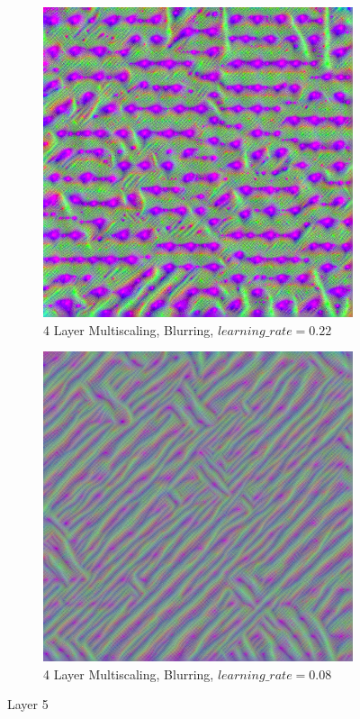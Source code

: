 \newpage
\begin{figure}
    \captionsetup{justification=centering}

    \begin{subfigure}[t]{0.48\textwidth}
        \captionsetup{justification=centering}
        \centering
        \includegraphics[width=.7\linewidth]{figuras/feat_vis/experiments/initial/l5/random_image_pl4_lr2.2e-1_layer10.png}
        \caption{4 Layer Multiscaling, Blurring, \(learning\_rate = 0.22\)}
    \end{subfigure}
    \hfill
    \begin{subfigure}[t]{0.48\textwidth}
        \captionsetup{justification=centering}
        \centering
        \includegraphics[width=.7\linewidth]{figuras/feat_vis/experiments/initial/l5/random_image_pl4_lr8e-2_layer10.png}
        \caption{4 Layer Multiscaling, Blurring, \(learning\_rate = 0.08\)}
    \end{subfigure}

    \caption{Layer 5}
    \label{fig:layer_5}
\end{figure}

